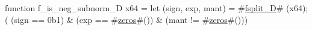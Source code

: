 function f_is_neg_subnorm_D   x64 = {
  let (sign, exp, mant) = #\hyperref[sailRISCVzfsplitzyD]{fsplit\_D}# (x64);
  (  (sign == 0b1)
   & (exp  == #\hyperref[sailRISCVzzzeros]{zeros}#())
   & (mant != #\hyperref[sailRISCVzzzeros]{zeros}#()))
}
